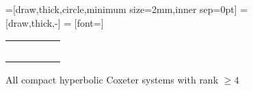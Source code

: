 \begin{figure}
	\centering
	=[draw,thick,circle,minimum size=2mm,inner sep=0pt]
	 = [draw,thick,-]
	 = [font=\small]

	\begin{tabular}{MMcMM}
		\comphyperfourlineone & \comphyperfoursquareone & \comphyperfiveone \\
		\comphyperfourlinetwo & \comphyperfoursquaretwo & \comphyperfivetwo \\
		\comphyperfourlinethree & \comphyperfoursquarethree & \comphyperfivethree \\
		\comphyperfourlinefour & \comphyperfoursquarefour & \comphyperfivefour \\
		& \comphyperfoursquarefive & \comphyperfivefive \\
	\end{tabular}
	\caption{All compact hyperbolic Coxeter systems with rank $\geq 4$}
	\label{fig:compact-hyperbolic-coxeter-systems}
\end{figure}